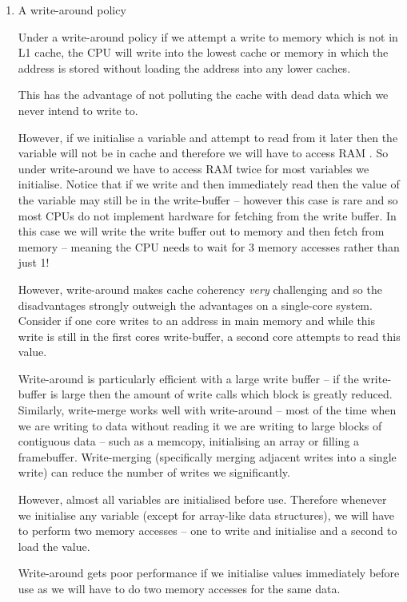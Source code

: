 \documentclass[10pt,\jkfside,a4paper]{article}
\begin{document}
\begin{enumerate}
\begin{enumerate}[label=(\alph*)]
\item A write-around policy

Under a write-around policy if we attempt a write to memory which is not in
L1 cache, the CPU will write into the lowest cache or memory in which
the address is stored without loading the address into any lower caches.

This has the advantage of not polluting the cache with dead data which we
never intend to write to.

However, if we initialise a variable and attempt to read from it later
then the variable will not be in cache and therefore we will have to access
RAM . So under write-around we have to access RAM twice for most variables
we initialise. Notice that if we write and then immediately read then the
value of the variable may still be in the write-buffer -- however this case
is rare and so most CPUs do not implement hardware for fetching from the
write buffer. In this case we will write the write buffer out to memory and
then fetch from memory -- meaning the CPU needs to wait for 3 memory accesses
rather than just 1!

\iffalse

However, write-around makes cache coherency \textit{very} challenging
and so the disadvantages strongly outweigh the advantages on a single-core
system. Consider if one core writes to an address in main memory and while
this write is still in the first cores write-buffer, a second core attempts to
read this value.

Write-around is particularly efficient with a large write buffer -- if the
write-buffer is large then the amount of write calls which block is greatly
reduced. Similarly, write-merge works well with write-around -- most of the
time when we are writing to data without reading it we are writing to large
blocks of contiguous data -- such as a memcopy, initialising an array or
filling a framebuffer. Write-merging (specifically merging adjacent writes
into a single write) can reduce the number of writes we significantly.

However, almost all variables are initialised before use. Therefore
whenever we initialise any variable (except for array-like data structures),
we will have to perform two memory accesses -- one to write and initialise
and a second to load the value.

Write-around gets poor performance if we initialise values immediately
before use as we will have to do two memory accesses for the same data.


\end{enumerate}
\end{enumerate}
\end{document}
